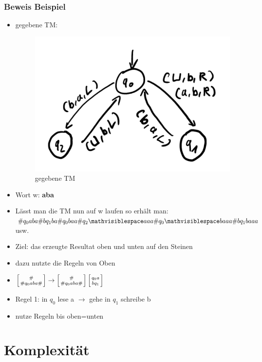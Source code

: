 \documentclass[12pt,a4paper]{article}
\begin{document}
\subsubsection{Beweis Beispiel}
\begin{itemize}
\item gegebene TM:
\begin{figure}[H]
\includegraphics[scale=0.3]{resources/tm1.png}
\caption{gegebene TM}
\label{fig}
\end{figure}
\item Wort w: \textbf{aba}
\item Lässt man die TM nun auf w laufen so erhält man:\\
$\# q_0 aba \# b q_1 ba \# q_0 baa \# q_2 \mathvisiblespace aaa \# q_0 \mathvisiblespace baaa \# b q_1 baaa$ usw.\\
\item Ziel: das erzeugte Resultat oben und unten auf den Steinen
\item dazu nutzte die Regeln von Oben
\item $\left[ {\# \atop \# q_0 aba \#} \right] \rightarrow \left[ {\# \atop \# q_0 aba \#} \right] \left[ {q_0 a \atop b q_1} \right]$
\item Regel 1: in $q_0$ lese a $\rightarrow$ gehe in $q_1$ schreibe b
\item nutze Regeln bis oben=unten
\end{itemize}

\newpage
\section{Komplexität}
\end{document}
